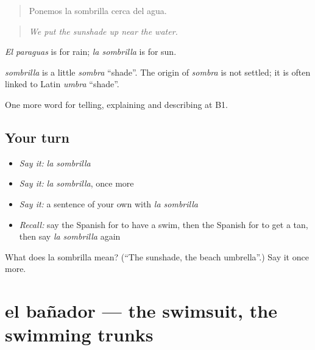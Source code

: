 \begin{quote}
Ponemos la sombrilla cerca del agua.
\end{quote}

\begin{quote}
\emph{We put the sunshade up near the water.}
\end{quote}

\emph{El paraguas} is for rain; \emph{la sombrilla} is for sun.

\begin{cousinweb}
\emph{sombrilla} is a little \emph{sombra} \textquotedblleft{}shade\textquotedblright{}. The origin of \emph{sombra} is not settled; it is often linked to Latin \emph{umbra} \textquotedblleft{}shade\textquotedblright{}.
\end{cousinweb}

\begin{grammarlens}[title={What you've built}]
One more word for telling, explaining and describing at B1.
\end{grammarlens}

\subsection*{Your turn}
\begin{itemize}
\raggedright
  \item \emph{Say it:} \emph{la sombrilla}
  \item \emph{Say it:} \emph{la sombrilla}, once more
  \item \emph{Say it:} a sentence of your own with \emph{la sombrilla}
  \item \emph{Recall:} say the Spanish for to have a swim, then the Spanish for to get a tan, then say \emph{la sombrilla} again
\end{itemize}

\begin{tcolorbox}[breakable,colback=teal!4,colframe=teal!35!black,title={Before you move on}]
What does la sombrilla mean? (\textquotedblleft{}The sunshade, the beach umbrella\textquotedblright{}.) Say it once more.
\end{tcolorbox}
\section[el bañador]{el bañador — the swimsuit, the swimming trunks}

\label{lesson:ES-C690-banador}



